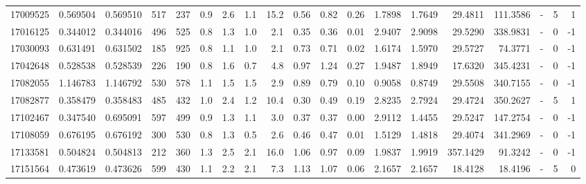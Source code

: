 \begin{tabular}{rrrrrrrrrrrrrrrrlrr}
  17009525 & 0.569504 &   0.569510 &  517 &  237 &      0.9 &      2.6 &     1.1 &     15.2 &       0.56 &        0.82 &        0.26 &  1.7898 &  1.7649 &   29.4811 &  111.3586 &             - &        5 &          1 \\
  17016125 & 0.344012 &   0.344016 &  496 &  525 &      0.8 &      1.3 &     1.0 &      2.1 &       0.35 &        0.36 &        0.01 &  2.9407 &  2.9098 &   29.5290 &  338.9831 &             - &        0 &         -1 \\
  17030093 & 0.631491 &   0.631502 &  185 &  925 &      0.8 &      1.1 &     1.0 &      2.1 &       0.73 &        0.71 &        0.02 &  1.6174 &  1.5970 &   29.5727 &   74.3771 &             - &        0 &         -1 \\
  17042648 & 0.528538 &   0.528539 &  226 &  190 &      0.8 &      1.6 &     0.7 &      4.8 &       0.97 &        1.24 &        0.27 &  1.9487 &  1.8949 &   17.6320 &  345.4231 &             - &        0 &         -1 \\
  17082055 & 1.146783 &   1.146792 &  530 &  578 &      1.1 &      1.5 &     1.5 &      2.9 &       0.89 &        0.79 &        0.10 &  0.9058 &  0.8749 &   29.5508 &  340.7155 &             - &        0 &         -1 \\
  17082877 & 0.358479 &   0.358483 &  485 &  432 &      1.0 &      2.4 &     1.2 &     10.4 &       0.30 &        0.49 &        0.19 &  2.8235 &  2.7924 &   29.4724 &  350.2627 &             - &        5 &          1 \\
  17102467 & 0.347540 &   0.695091 &  597 &  499 &      0.9 &      1.3 &     1.1 &      3.0 &       0.37 &        0.37 &        0.00 &  2.9112 &  1.4455 &   29.5247 &  147.2754 &             - &        0 &         -1 \\
  17108059 & 0.676195 &   0.676192 &  300 &  530 &      0.8 &      1.3 &     0.5 &      2.6 &       0.46 &        0.47 &        0.01 &  1.5129 &  1.4818 &   29.4074 &  341.2969 &             - &        0 &         -1 \\
  17133581 & 0.504824 &   0.504813 &  212 &  360 &      1.3 &      2.5 &     2.1 &     16.0 &       1.06 &        0.97 &        0.09 &  1.9837 &  1.9919 &  357.1429 &   91.3242 &             - &        0 &         -1 \\
  17151564 & 0.473619 &   0.473626 &  599 &  430 &      1.1 &      2.2 &     2.1 &      7.3 &       1.13 &        1.07 &        0.06 &  2.1657 &  2.1657 &   18.4128 &   18.4196 &             - &        5 &          0 \\

\end{tabular}
